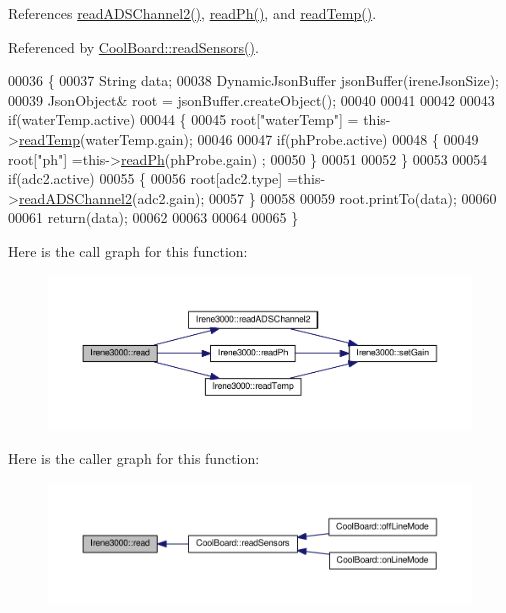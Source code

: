 References \hyperlink{irene3000_8cpp_source_l00256}{read\+A\+D\+S\+Channel2()}, \hyperlink{irene3000_8cpp_source_l00270}{read\+Ph()}, and \hyperlink{irene3000_8cpp_source_l00291}{read\+Temp()}.



Referenced by \hyperlink{_cool_board_8cpp_source_l00509}{Cool\+Board\+::read\+Sensors()}.


\begin{DoxyCode}
00036 \{   
00037     String data;
00038     DynamicJsonBuffer jsonBuffer(ireneJsonSize);
00039     JsonObject& root = jsonBuffer.createObject();
00040 
00041 
00042         
00043     \textcolor{keywordflow}{if}(waterTemp.active)
00044     \{
00045         root[\textcolor{stringliteral}{"waterTemp"}] = this->\hyperlink{class_irene3000_a94ad40f281d83ad1be20bf1edd6fe802}{readTemp}(waterTemp.gain);
00046 
00047         \textcolor{keywordflow}{if}(phProbe.active)
00048         \{
00049             root[\textcolor{stringliteral}{"ph"}] =this->\hyperlink{class_irene3000_abf3db725fabb0634ec889b32068a5eec}{readPh}(phProbe.gain) ;
00050         \}
00051 
00052     \}
00053 
00054     \textcolor{keywordflow}{if}(adc2.active)
00055     \{
00056         root[adc2.type] =this->\hyperlink{class_irene3000_ae73bd2ed14a199a7e83f4d6458476a7c}{readADSChannel2}(adc2.gain);
00057     \}
00058     
00059     root.printTo(data);
00060     
00061     \textcolor{keywordflow}{return}(data);
00062     
00063     
00064 
00065 \}
\end{DoxyCode}
Here is the call graph for this function\+:
\nopagebreak
\begin{figure}[H]
\begin{center}
\leavevmode
\includegraphics[width=350pt]{class_irene3000_a852a170feea994ea1df01c6b245b5d9a_cgraph}
\end{center}
\end{figure}
Here is the caller graph for this function\+:
\nopagebreak
\begin{figure}[H]
\begin{center}
\leavevmode
\includegraphics[width=350pt]{class_irene3000_a852a170feea994ea1df01c6b245b5d9a_icgraph}
\end{center}
\end{figure}
